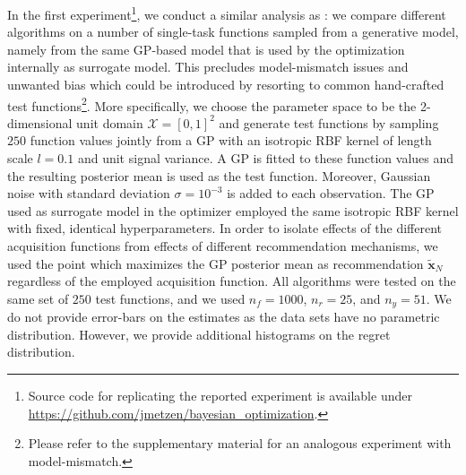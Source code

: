 \documentclass[10pt,letterpaper]{article} %
\begin{document}
In the first experiment\footnote{Source code for replicating the reported experiment
is available under \url{https://github.com/jmetzen/bayesian_optimization}.}, 
we conduct a similar analysis as \citet[Section
3.1]{hennig_entropy_2012}: we compare different algorithms on a number of
single-task functions sampled from a generative model, namely from the same GP-based model
that is used by the optimization internally as surrogate model. This precludes
model-mismatch issues and unwanted bias which could be introduced by resorting
to common hand-crafted test functions\footnote{Please refer to the supplementary material for an analogous experiment with model-mismatch.}. More specifically, we choose the
parameter space to be the 2-dimensional unit domain $\mathcal{X} = [0, 1]^2$ and generate test
functions by sampling $250$ function values jointly from a GP with an isotropic RBF kernel
of length scale $l = 0.1$ and unit signal variance. A GP is
fitted to these function values and the resulting posterior mean is used as the
test function. Moreover, Gaussian noise with standard deviation $\sigma =
10^{-3}$ is added to each observation. The GP used as surrogate model in the optimizer employed the same 
isotropic RBF kernel with fixed, identical hyperparameters. 
In order to isolate effects of the different acquisition functions from effects of different
recommendation mechanisms, we used the point which maximizes the GP posterior
mean as recommendation $\mathbf{\tilde x}_N$ regardless of the employed acquisition function.
All algorithms were tested on the same
set of $250$ test functions, and we used $n_f=1000$, $n_r=25$, and $n_y=51$.
We do not provide error-bars on the estimates as the data sets have no parametric distribution. 
However, we provide additional histograms on the regret distribution.
\end{document}
